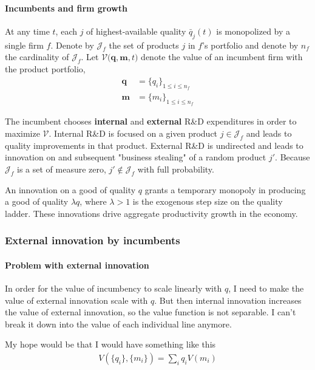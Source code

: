 \documentclass[12pt,english]{article}
\theoremstyle{remark}
\begin{document}
\paragraph{Incumbents and firm growth}

At any time $t$, each $j$ of highest-available quality $\bar{q}_j(t)$ is monopolized by a single firm $f$. Denote by $\mathcal{J}_f$ the set of products $j$ in $f$'s portfolio and denote by $n_f$ the cardinality of $\mathcal{J}_f$. Let $\mathcal{V}\Big(\textbf{q},\textbf{m},t\Big)$ denote the value of an incumbent firm with the product portfolio, 
\begin{align*}
\textbf{q} &= \{q_i\}_{1\le i \le n_f} \\
\textbf{m} &= \{m_i\}_{1 \le i \le n_f}
\end{align*} 

The incumbent chooses \textbf{internal} and \textbf{external} R\&D expenditures in order to maximize $\mathcal{V}$. Internal R\&D is focused on a given product $j \in \mathcal{J}_f$ and leads to quality improvements in that product. External R\&D is undirected and leads to innovation on and subsequent "business stealing" of a random product $j'$. Because $\mathcal{J}_f$ is a set of measure zero, $j' \notin \mathcal{J}_f$ with full probability. 

An innovation on a good of quality $q$ grants a temporary monopoly in producing a good of quality $\lambda q$, where $\lambda > 1$ is the exogenous step size on the quality ladder. These innovations drive aggregate productivity growth in the economy. 



\subsubsection{External innovation by incumbents}

\paragraph{Problem with external innovation}

In order for the value of incumbency to scale linearly with $q$, I need to make the value of external innovation scale with $q$. But then internal innovation increases the value of external innovation, so the value function is not separable. I can't break it down into the value of each individual line anymore. 

My hope would be that I would have something like this 
\begin{align*}
V(\{q_i\},\{m_i\}) = \sum_i q_i V(m_i)
\end{align*}
\end{document}
